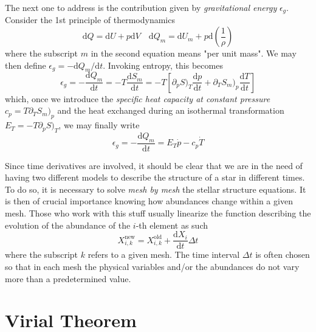 \par The next one to address is the contribution given by \emph{gravitational energy} $\epsilon_{g}$. Consider the 1st principle of thermodynamics
\begin{equation}
	\text{d}Q = \text{d}U + p\text{d}V \quad \text{d}Q_{m} = \text{d}U_{m} + p\text{d}\left(\frac{1}{\rho}\right)
	\label{eq:1st_principle}
\end{equation}
where the subscript $m$ in the second equation means "per unit mass". We may then define $\epsilon_{g} = -\text{d}Q_{m}/\text{d}t$. Invoking entropy, this becomes
\begin{equation*}
	\epsilon_{g} = -\frac{\text{d}Q_{m}}{\text{d}t} = -T\frac{\text{d}S_{m}}{\text{d}t} = -T\left[\partial_{p}S)_{T}\frac{\text{d}p}{\text{d}t}+\partial_{T}S_{m})_{p}\frac{\text{d}T}{\text{d}t}\right]
\end{equation*}
which, once we introduce the \emph{specific heat capacity at constant pressure} $c_{p} = T\partial_{T}S_{m})_{p}$ and the heat exchanged during an isothermal transformation $E_{T} = -T\partial_{p}S)_{T}$, we may finally write
\begin{equation}
	\epsilon_{g} = -\frac{\text{d}Q_{m}}{\text{d}t} = E_{T}\dot{p}-c_{p}\dot{T}
	\label{eq:gravitationalenergy_productionrate}
\end{equation}
\par Since time derivatives are involved, it should be clear that we are in the need of having two different models to describe the structure of a star in different times. To do so, it is necessary to solve \emph{mesh by mesh} the stellar structure equations. It is then of crucial importance knowing how abundances change within a given mesh. Those who work with this stuff usually linearize the function describing the evolution of the abundance of the $i$-th element as such
\begin{equation}
	X_{i,k}^{\text{new}} = X_{i,k}^{\text{old}} + \frac{\text{d}X_{i}}{\text{d}t}\Delta t
	\label{eq:linearized_abundancevolution}
\end{equation}
where the subscript $k$ refers to a given mesh. The time interval $\Delta t$ is often chosen so that in each mesh the physical variables and/or the abundances do not vary more than a predetermined value.

\section{Virial Theorem}

